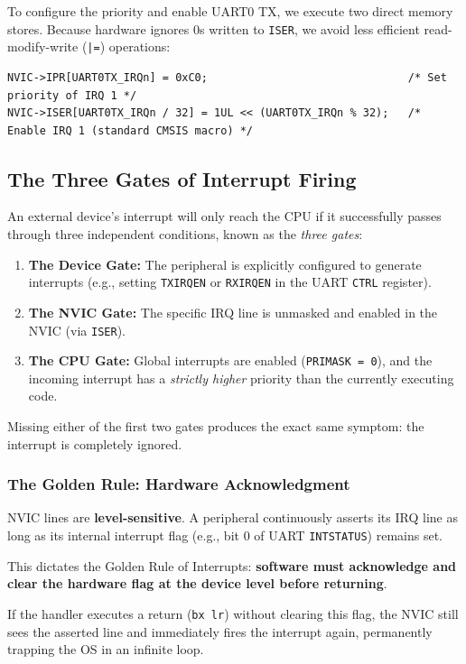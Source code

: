 To configure the priority and enable UART0 TX, we execute two direct memory stores. Because hardware ignores 0s written to \texttt{ISER}, we avoid less efficient read-modify-write (\texttt{|=}) operations:

\begin{lstlisting}
NVIC->IPR[UART0TX_IRQn] = 0xC0;                               /* Set priority of IRQ 1 */
NVIC->ISER[UART0TX_IRQn / 32] = 1UL << (UART0TX_IRQn % 32);   /* Enable IRQ 1 (standard CMSIS macro) */
\end{lstlisting}

\subsection{The Three Gates of Interrupt Firing}
An external device's interrupt will only reach the CPU if it successfully passes through three independent conditions, known as the \textit{three gates}:
\begin{enumerate}
    \item \textbf{The Device Gate:} The peripheral is explicitly configured to generate interrupts (e.g., setting \texttt{TXIRQEN} or \texttt{RXIRQEN} in the UART \texttt{CTRL} register).
    \item \textbf{The NVIC Gate:} The specific IRQ line is unmasked and enabled in the NVIC (via \texttt{ISER}).
    \item \textbf{The CPU Gate:} Global interrupts are enabled (\texttt{PRIMASK = 0}), and the incoming interrupt has a \textit{strictly higher} priority than the currently executing code.
\end{enumerate}
Missing either of the first two gates produces the exact same symptom: the interrupt is completely ignored.

\subsubsection*{The Golden Rule: Hardware Acknowledgment}
NVIC lines are \textbf{level-sensitive}. A peripheral continuously asserts its IRQ line as long as its internal interrupt flag (e.g., bit 0 of UART \texttt{INTSTATUS}) remains set. 

This dictates the Golden Rule of Interrupts: \textbf{software must acknowledge and clear the hardware flag at the device level before returning}. 

If the handler executes a return (\texttt{bx lr}) without clearing this flag, the NVIC still sees the asserted line and immediately fires the interrupt again, permanently trapping the OS in an infinite loop. 

